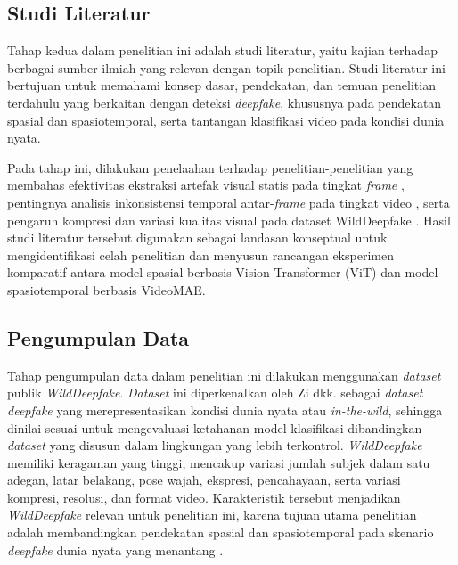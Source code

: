 \subsection{Studi Literatur} \label{III.Studi Literatur}
Tahap kedua dalam penelitian ini adalah studi literatur, yaitu kajian terhadap berbagai sumber ilmiah yang relevan dengan topik penelitian. Studi literatur ini bertujuan untuk memahami konsep dasar, pendekatan, dan temuan penelitian terdahulu yang berkaitan dengan deteksi \textit{deepfake}, khususnya pada pendekatan spasial dan spasiotemporal, serta tantangan klasifikasi video pada kondisi dunia nyata. \par

Pada tahap ini, dilakukan penelaahan terhadap penelitian-penelitian yang membahas efektivitas ekstraksi artefak visual statis pada tingkat \textit{frame} \cite{Tolosana2020,Cao2022}, pentingnya analisis inkonsistensi temporal antar-\textit{frame} pada tingkat video \cite{Gu2021}, serta pengaruh kompresi dan variasi kualitas visual pada dataset WildDeepfake \cite{Zi2024}. Hasil studi literatur tersebut digunakan sebagai landasan konseptual untuk mengidentifikasi celah penelitian dan menyusun rancangan eksperimen komparatif antara model spasial berbasis Vision Transformer (ViT) dan model spasiotemporal berbasis VideoMAE. \par

\subsection{Pengumpulan Data} \label{III.Pengumpulan Data}
Tahap pengumpulan data dalam penelitian ini dilakukan menggunakan \textit{dataset} publik \textit{WildDeepfake}\cite{wilddeepfake_hf}. \textit{Dataset} ini diperkenalkan oleh Zi dkk. \cite{Zi2024} sebagai \textit{dataset deepfake} yang merepresentasikan kondisi dunia nyata atau \textit{in-the-wild}, sehingga dinilai sesuai untuk mengevaluasi ketahanan model klasifikasi dibandingkan \textit{dataset} yang disusun dalam lingkungan yang lebih terkontrol. \textit{WildDeepfake} memiliki keragaman yang tinggi, mencakup variasi jumlah subjek dalam satu adegan, latar belakang, pose wajah, ekspresi, pencahayaan, serta variasi kompresi, resolusi, dan format video. Karakteristik tersebut menjadikan \textit{WildDeepfake} relevan untuk penelitian ini, karena tujuan utama penelitian adalah membandingkan pendekatan spasial dan spasiotemporal pada skenario \textit{deepfake} dunia nyata yang menantang \cite{Zi2024}. \par

